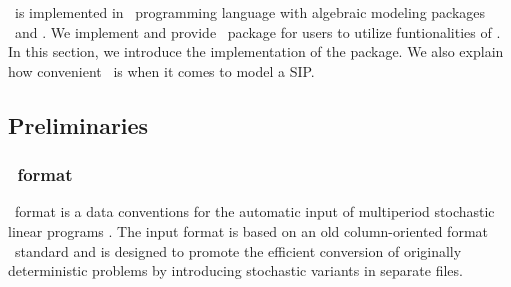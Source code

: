 \siplibtwo\ is implemented in \julia\ programming language with algebraic modeling packages \jump\ and \structjump. We implement and provide \julia\ package for users to utilize funtionalities of \siplibtwo. In this section, we introduce the implementation of the package. We also explain how convenient \structjump\ is when it comes to model a SIP.

\subsection{Preliminaries}
\subsubsection{\smps\ format} \label{subsec:smps}
\smps\ format is a data conventions for the automatic input of multiperiod stochastic linear programs \cite{SMPS}. The input format is based on an old column-oriented format \mpsx\ standard and is designed to promote the efficient conversion of originally deterministic problems by introducing stochastic variants in separate files. 

